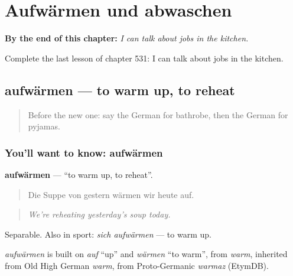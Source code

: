 
\chapter{Aufwärmen und abwaschen}
\label{ch:ge-aufwarmen-und-abwaschen}

\begin{chapteropening}
\textbf{By the end of this chapter:} \emph{I can talk about jobs in the kitchen.}

Complete the last lesson of chapter 531: I can talk about jobs in the kitchen.
\end{chapteropening}

\section[aufwärmen]{aufwärmen — to warm up, to reheat}

\label{lesson:GE-C531-aufwaermen}



\begin{quote}
Before the new one: say the German for bathrobe, then the German for pyjamas.
\end{quote}

\subsection*{You'll want to know: aufwärmen}
\textbf{aufwärmen} — \textquotedblleft{}to warm up, to reheat\textquotedblright{}.

\begin{quote}
Die Suppe von gestern wärmen wir heute auf.
\end{quote}

\begin{quote}
\emph{We're reheating yesterday's soup today.}
\end{quote}

Separable. Also in sport: \emph{sich aufwärmen} — to warm up.

\begin{cousinweb}
\emph{aufwärmen} is built on \emph{auf} \textquotedblleft{}up\textquotedblright{} and \emph{wärmen} \textquotedblleft{}to warm\textquotedblright{}, from \emph{warm}, inherited from Old High German \emph{warm}, from Proto-Germanic \emph{warmaz} (EtymDB).
\end{cousinweb}

